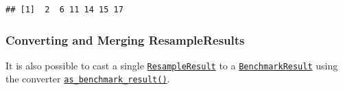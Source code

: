 \documentclass[]{article}
\newenvironment{Shaded}{\begin{snugshade}}{\end{snugshade}}
\newcommand{\CommentTok}[1]{\textcolor[rgb]{0.56,0.35,0.01}{\textit{#1}}}
\newcommand{\KeywordTok}[1]{\textcolor[rgb]{0.13,0.29,0.53}{\textbf{#1}}}
\newcommand{\NormalTok}[1]{#1}
\newcommand{\OperatorTok}[1]{\textcolor[rgb]{0.81,0.36,0.00}{\textbf{#1}}}
\newcommand{\StringTok}[1]{\textcolor[rgb]{0.31,0.60,0.02}{#1}}
\renewenvironment{Shaded} {\begin{snugshade}\small} {\end{snugshade}}
\begin{document}
\begin{Shaded}
\end{Shaded}

\begin{verbatim}
## [1]  2  6 11 14 15 17
\end{verbatim}

\hypertarget{converting-and-merging-resampleresults}{%
\subsubsection{Converting and Merging ResampleResults}\label{converting-and-merging-resampleresults}}

It is also possible to cast a single \href{https://mlr3.mlr-org.com/reference/ResampleResult.html}{\texttt{ResampleResult}} to a \href{https://mlr3.mlr-org.com/reference/BenchmarkResult.html}{\texttt{BenchmarkResult}} using the converter \href{https://mlr3.mlr-org.com/reference/as_benchmark_result.html}{\texttt{as\_benchmark\_result()}}.

\begin{Shaded}
\end{Shaded}
\end{document}

